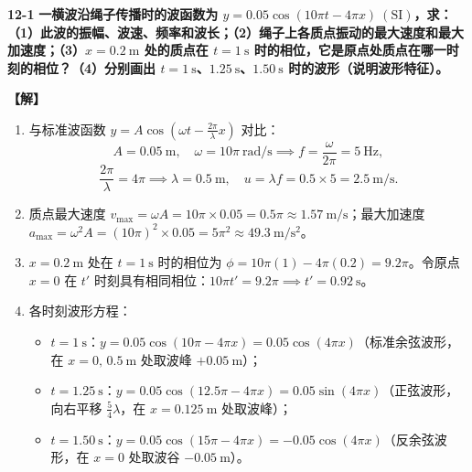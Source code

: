\documentclass[zihao=5,a4paper,UTF8]{ctexart}
\newenvironment{prob}[2]{%
    \par\vspace{6pt}\noindent\textbf{\color{navy}#1} \textbf{#2}\par\nopagebreak\vspace{2pt}%
}{%
    \par\vspace{4pt}%
}
\newcommand{\sol}{\noindent\textbf{\color{tealaccent}【解】}\ }
\begin{document}
\begin{prob}{12-1}{一横波沿绳子传播时的波函数为 $y = 0.05\cos(10\pi t - 4\pi x)\ (\mathrm{SI})$，求：（1）此波的振幅、波速、频率和波长；（2）绳子上各质点振动的最大速度和最大加速度；（3）$x=0.2\ \mathrm{m}$ 处的质点在 $t=1\ \mathrm{s}$ 时的相位，它是原点处质点在哪一时刻的相位？（4）分别画出 $t=1\ \mathrm{s}$、$1.25\ \mathrm{s}$、$1.50\ \mathrm{s}$ 时的波形（说明波形特征）。}
\sol
\begin{enumerate}[leftmargin=2em, itemsep=2pt]
    \item 与标准波函数 $y = A\cos\left(\omega t - \frac{2\pi}{\lambda}x\right)$ 对比：
    \[
        A = 0.05\ \mathrm{m},\quad \omega = 10\pi\ \mathrm{rad/s} \implies f = \frac{\omega}{2\pi} = 5\ \mathrm{Hz},
    \]
    \[
        \frac{2\pi}{\lambda} = 4\pi \implies \lambda = 0.5\ \mathrm{m},\quad u = \lambda f = 0.5\times 5 = 2.5\ \mathrm{m/s}.
    \]
    \item 质点最大速度 $v_{\max} = \omega A = 10\pi \times 0.05 = 0.5\pi \approx 1.57\ \mathrm{m/s}$；最大加速度 $a_{\max} = \omega^2 A = (10\pi)^2 \times 0.05 = 5\pi^2 \approx 49.3\ \mathrm{m/s^2}$。
    \item $x=0.2\ \mathrm{m}$ 处在 $t=1\ \mathrm{s}$ 时的相位为 $\phi = 10\pi(1) - 4\pi(0.2) = 9.2\pi$。令原点 $x=0$ 在 $t'$ 时刻具有相同相位：$10\pi t' = 9.2\pi \implies t' = 0.92\ \mathrm{s}$。
    \item 各时刻波形方程：
    \begin{itemize}[leftmargin=1.5em]
        \item $t=1\ \mathrm{s}$：$y = 0.05\cos(10\pi - 4\pi x) = 0.05\cos(4\pi x)$（标准余弦波形，在 $x=0,\,0.5\ \mathrm{m}$ 处取波峰 $+0.05\ \mathrm{m}$）；
        \item $t=1.25\ \mathrm{s}$：$y = 0.05\cos(12.5\pi - 4\pi x) = 0.05\sin(4\pi x)$（正弦波形，向右平移 $\frac{5}{4}\lambda$，在 $x=0.125\ \mathrm{m}$ 处取波峰）；
        \item $t=1.50\ \mathrm{s}$：$y = 0.05\cos(15\pi - 4\pi x) = -0.05\cos(4\pi x)$（反余弦波形，在 $x=0$ 处取波谷 $-0.05\ \mathrm{m}$）。
    \end{itemize}
\end{enumerate}
\end{prob}
\end{document}
